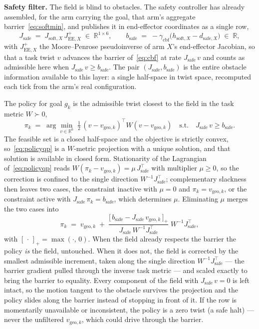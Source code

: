 \documentclass[12pt,a4paper,twoside,openright]{report}
\begin{document}
\textbf{Safety filter.} The field is blind to obstacles. The safety controller has already assembled, for the arm carrying the goal, that arm's aggregate barrier~\eqref{eq:softmin}, and publishes it in end-effector coordinates as a single row,
\begin{equation}
J_{\text{safe}} \;=\; J_{\text{soft},X}\,J_{\text{EE},X}^{+} \;\in\; \mathbb{R}^{1\times 6},
\qquad
b_{\text{safe}} \;=\; -\gamma_{\text{cbf}}\bigl(h_{\text{soft},X} - d_{\text{safe},X}\bigr) \;\in\; \mathbb{R},
\label{eq:jsafe}
\end{equation}
with $J_{\text{EE},X}^{+}$ the Moore--Penrose pseudoinverse of arm $X$'s end-effector Jacobian, so that a task twist $v$ advances the barrier of~\eqref{eq:cbf} at rate $J_{\text{safe}}\,v$ and counts as admissible here when $J_{\text{safe}}\,v \ge b_{\text{safe}}$. The pair $(J_{\text{safe}}, b_{\text{safe}})$ is the entire obstacle information available to this layer: a single half-space in twist space, recomputed each tick from the arm's real configuration.

The policy for goal $g_k$ is the admissible twist closest to the field in the task metric $W \succ 0$,
\begin{equation}
\pi_k \;=\; \arg\min_{v \in \mathbb{R}^6}\; \tfrac{1}{2}\,(v - v_{\text{geo},k})^{\top} W (v - v_{\text{geo},k})
\quad \text{s.t.} \quad J_{\text{safe}}\, v \ge b_{\text{safe}}.
\label{eq:policyqp}
\end{equation}
The feasible set is a closed half-space and the objective is strictly convex, so~\eqref{eq:policyqp} is a $W$-metric projection with a unique solution, and that solution is available in closed form. Stationarity of the Lagrangian of~\eqref{eq:policyqp} reads $W(\pi_k - v_{\text{geo},k}) = \mu\,J_{\text{safe}}^{\top}$ with multiplier $\mu \ge 0$, so the correction is confined to the single direction $W^{-1}J_{\text{safe}}^{\top}$; complementary slackness then leaves two cases, the constraint inactive with $\mu = 0$ and $\pi_k = v_{\text{geo},k}$, or the constraint active with $J_{\text{safe}}\,\pi_k = b_{\text{safe}}$, which determines $\mu$. Eliminating $\mu$ merges the two cases into
\begin{equation}
\pi_k \;=\; v_{\text{geo},k} \;+\; \frac{\bigl[\,b_{\text{safe}} - J_{\text{safe}}\,v_{\text{geo},k}\,\bigr]_{+}}{J_{\text{safe}}\,W^{-1}J_{\text{safe}}^{\top}}\;W^{-1}J_{\text{safe}}^{\top},
\label{eq:policyproj}
\end{equation}
with $[\,\cdot\,]_{+} = \max(\cdot,\,0)$. When the field already respects the barrier the policy \emph{is} the field, untouched. When it does not, the field is corrected by the smallest admissible increment, taken along the single direction $W^{-1}J_{\text{safe}}^{\top}$ --- the barrier gradient pulled through the inverse task metric --- and scaled exactly to bring the barrier to equality. Every component of the field with $J_{\text{safe}}\,v = 0$ is left intact, so the motion tangent to the obstacle survives the projection and the policy slides along the barrier instead of stopping in front of it. If the row is momentarily unavailable or inconsistent, the policy is a zero twist (a safe halt) --- never the unfiltered $v_{\text{geo},k}$, which could drive through the barrier.
\end{document}
